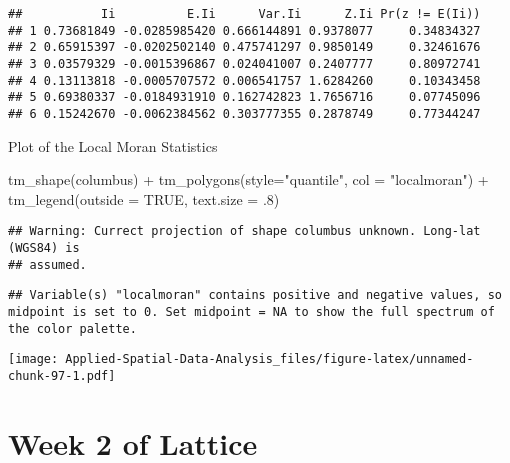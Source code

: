 \documentclass[
]{book}
\newenvironment{Shaded}{\begin{snugshade}}{\end{snugshade}}
\newcommand{\AttributeTok}[1]{\textcolor[rgb]{0.77,0.63,0.00}{#1}}
\newcommand{\ConstantTok}[1]{\textcolor[rgb]{0.00,0.00,0.00}{#1}}
\newcommand{\DecValTok}[1]{\textcolor[rgb]{0.00,0.00,0.81}{#1}}
\newcommand{\FunctionTok}[1]{\textcolor[rgb]{0.00,0.00,0.00}{#1}}
\newcommand{\NormalTok}[1]{#1}
\newcommand{\OtherTok}[1]{\textcolor[rgb]{0.56,0.35,0.01}{#1}}
\newcommand{\SpecialCharTok}[1]{\textcolor[rgb]{0.00,0.00,0.00}{#1}}
\newcommand{\StringTok}[1]{\textcolor[rgb]{0.31,0.60,0.02}{#1}}
\begin{document}
\begin{verbatim}
##           Ii          E.Ii      Var.Ii      Z.Ii Pr(z != E(Ii))
## 1 0.73681849 -0.0285985420 0.666144891 0.9378077     0.34834327
## 2 0.65915397 -0.0202502140 0.475741297 0.9850149     0.32461676
## 3 0.03579329 -0.0015396867 0.024041007 0.2407777     0.80972741
## 4 0.13113818 -0.0005707572 0.006541757 1.6284260     0.10343458
## 5 0.69380337 -0.0184931910 0.162742823 1.7656716     0.07745096
## 6 0.15242670 -0.0062384562 0.303777355 0.2878749     0.77344247
\end{verbatim}

\begin{Shaded}
\end{Shaded}

Plot of the Local Moran Statistics

\begin{Shaded}
\begin{Highlighting}[]
\FunctionTok{tm\_shape}\NormalTok{(columbus) }\SpecialCharTok{+} \FunctionTok{tm\_polygons}\NormalTok{(}\AttributeTok{style=}\StringTok{"quantile"}\NormalTok{, }\AttributeTok{col =} \StringTok{"localmoran"}\NormalTok{) }\SpecialCharTok{+}
     \FunctionTok{tm\_legend}\NormalTok{(}\AttributeTok{outside =} \ConstantTok{TRUE}\NormalTok{, }\AttributeTok{text.size =}\NormalTok{ .}\DecValTok{8}\NormalTok{)}
\end{Highlighting}
\end{Shaded}

\begin{verbatim}
## Warning: Currect projection of shape columbus unknown. Long-lat (WGS84) is
## assumed.
\end{verbatim}

\begin{verbatim}
## Variable(s) "localmoran" contains positive and negative values, so midpoint is set to 0. Set midpoint = NA to show the full spectrum of the color palette.
\end{verbatim}

\texttt{[image: Applied-Spatial-Data-Analysis\_files/figure-latex/unnamed-chunk-97-1.pdf]}

\hypertarget{week-2-of-lattice}{%
\section{Week 2 of Lattice}\label{week-2-of-lattice}}
\end{document}
